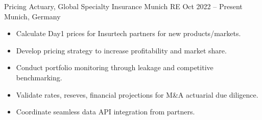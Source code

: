 \documentclass[a4paper,]{fortysecondscv}
\begin{document}
\begin{cvtable}%


    \vspace{\topsep}
    \cvitemoneblock
    {Pricing Actuary, Global Specialty Insurance}
    {Munich RE}
    {Oct 2022 -- Present}
    {Munich, Germany}
    {
        \begin{itemize}[nosep, leftmargin=12pt, label={-}] %
            \item Calculate Day1 prices for Insurtech partners for new products\//markets.
            \item Develop pricing strategy to increase profitability and market share.
            \item Conduct portfolio monitoring through leakage and competitive benchmarking.
            \item Validate rates, reseves, financial projections for M\&A actuarial due diligence.
            \item Coordinate seamless data API integration from partners.
        \end{itemize}
    }


\end{cvtable}
\end{document}

